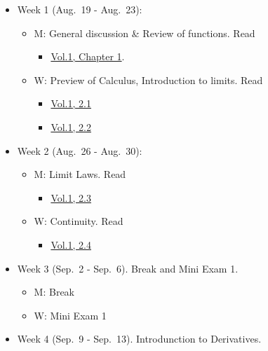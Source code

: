 \documentclass[
]{article}
\providecommand{\tightlist}{%
  \setlength{\itemsep}{0pt}\setlength{\parskip}{0pt}}
\begin{document}
\begin{itemize}
\tightlist
\item
  Week 1 (Aug.~19 - Aug.~23):

  \begin{itemize}
  \tightlist
  \item
    M: General discussion \& Review of functions. Read

    \begin{itemize}
    \tightlist
    \item
      \href{https://openstax.org/books/calculus-volume-1/pages/1-introduction}{Vol.1, Chapter 1}.
    \end{itemize}
  \item
    W: Preview of Calculus, Introduction to limits. Read

    \begin{itemize}
    \tightlist
    \item
      \href{https://openstax.org/books/calculus-volume-1/pages/2-1-a-preview-of-calculus}{Vol.1, 2.1}
    \item
      \href{https://openstax.org/books/calculus-volume-1/pages/2-2-the-limit-of-a-function}{Vol.1, 2.2}
    \end{itemize}
  \end{itemize}
\item
  Week 2 (Aug.~26 - Aug.~30):

  \begin{itemize}
  \tightlist
  \item
    M: Limit Laws. Read

    \begin{itemize}
    \tightlist
    \item
      \href{https://openstax.org/books/calculus-volume-1/pages/2-3-the-limit-laws}{Vol.1, 2.3}
    \end{itemize}
  \item
    W: Continuity. Read

    \begin{itemize}
    \tightlist
    \item
      \href{https://openstax.org/books/calculus-volume-1/pages/2-4-continuity}{Vol.1, 2.4}
    \end{itemize}
  \end{itemize}
\item
  Week 3 (Sep.~2 - Sep.~6). Break and Mini Exam 1.

  \begin{itemize}
  \tightlist
  \item
    M: Break
  \item
    W: Mini Exam 1
  \end{itemize}
\item
  Week 4 (Sep.~9 - Sep.~13). Introdunction to Derivatives.


\end{itemize}
\end{document}
